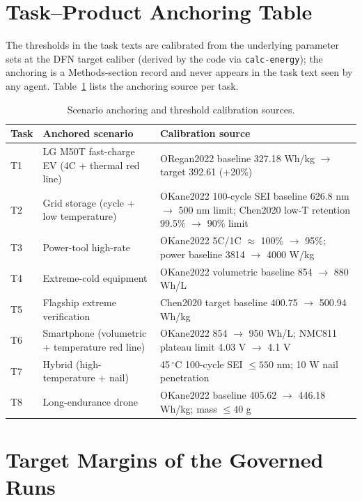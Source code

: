 \documentclass[review,11pt]{elsarticle}
\begin{document}
\section{Task--Product Anchoring Table}

The thresholds in the task texts are calibrated from the underlying
parameter sets at the DFN target caliber (derived by the code via
\texttt{calc-energy}); the anchoring is a Methods-section record and never
appears in the task text seen by any agent. Table~\ref{tab:anchor} lists
the anchoring source per task.

\begin{table}[!ht]
\centering
\caption{Scenario anchoring and threshold calibration sources.}
\label{tab:anchor}
\begin{tabular}{p{0.9cm}p{4.9cm}p{5.4cm}}
\toprule
Task & Anchored scenario & Calibration source \\
\midrule
T1 & LG M50T fast-charge EV (4C + thermal red line) & ORegan2022 baseline 327.18 Wh/kg $\rightarrow$ target 392.61 (+20\%) \\
T2 & Grid storage (cycle + low temperature) & OKane2022 100-cycle SEI baseline 626.8 nm $\rightarrow$ 500 nm limit; Chen2020 low-T retention 99.5\% $\rightarrow$ 90\% limit \\
T3 & Power-tool high-rate & OKane2022 5C/1C $\approx$ 100\% $\rightarrow$ 95\%; power baseline 3814 $\rightarrow$ 4000 W/kg \\
T4 & Extreme-cold equipment & OKane2022 volumetric baseline 854 $\rightarrow$ 880 Wh/L \\
T5 & Flagship extreme verification & Chen2020 target baseline 400.75 $\rightarrow$ 500.94 Wh/kg \\
T6 & Smartphone (volumetric + temperature red line) & OKane2022 854 $\rightarrow$ 950 Wh/L; NMC811 plateau limit 4.03 V $\rightarrow$ 4.1 V \\
T7 & Hybrid (high-temperature + nail) & 45\,$^\circ$C 100-cycle SEI $\leq 550$ nm; 10 W nail penetration \\
T8 & Long-endurance drone & OKane2022 baseline 405.62 $\rightarrow$ 446.18 Wh/kg; mass $\leq 40$ g \\
\bottomrule
\end{tabular}
\end{table}

\section{Target Margins of the Governed Runs}
\end{document}
